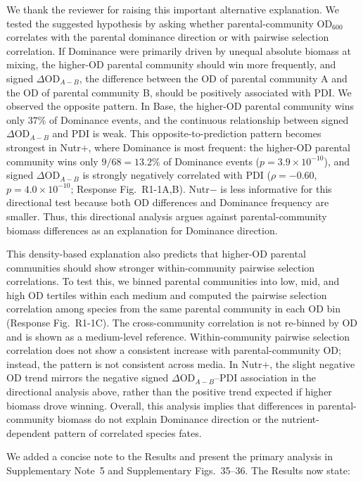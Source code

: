 \responselabel
We thank the reviewer for raising this important alternative explanation. We tested the suggested hypothesis by asking whether parental-community OD$_{600}$ correlates with the parental dominance direction or with pairwise selection correlation.
If Dominance were primarily driven by unequal absolute biomass at mixing, the higher-OD parental community should win more frequently, and signed $\Delta\text{OD}_{A-B}$, the difference between the OD of parental community A and the OD of parental community B, should be positively associated with PDI. We observed the opposite pattern. In Base, the higher-OD parental community wins only $37\%$ of Dominance events, and the continuous relationship between signed $\Delta\text{OD}_{A-B}$ and PDI is weak. This opposite-to-prediction pattern becomes strongest in Nutr$+$, where Dominance is most frequent: the higher-OD parental community wins only $9/68 = 13.2\%$ of Dominance events ($p = 3.9 \times 10^{-10}$), and signed $\Delta\text{OD}_{A-B}$ is strongly negatively correlated with PDI ($\rho = -0.60$, $p = 4.0 \times 10^{-10}$; Response Fig.~R1-1A,B). Nutr$-$ is less informative for this directional test because both OD differences and Dominance frequency are smaller. Thus, this directional analysis argues against parental-community biomass differences as an explanation for Dominance direction.

This density-based explanation also predicts that higher-OD parental communities should show stronger within-community pairwise selection correlations. To test this, we binned parental communities into low, mid, and high OD tertiles within each medium and computed the pairwise selection correlation among species from the same parental community in each OD bin (Response Fig.~R1-1C). The cross-community correlation is not re-binned by OD and is shown as a medium-level reference. Within-community pairwise selection correlation does not show a consistent increase with parental-community OD; instead, the pattern is not consistent across media. In Nutr$+$, the slight negative OD trend mirrors the negative signed $\Delta\text{OD}_{A-B}$--PDI association in the directional analysis above, rather than the positive trend expected if higher biomass drove winning. Overall, this analysis implies that differences in parental-community biomass do not explain Dominance direction or the nutrient-dependent pattern of correlated species fates.

We added a concise note to the Results and present the primary analysis in Supplementary Note~5 and Supplementary Figs.~35--36. The Results now state: 

